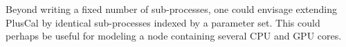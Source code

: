\documentclass{article}
\begin{document}
Beyond writing a fixed number of sub-processes, one could envisage extending PlusCal by identical sub-processes indexed by a parameter set. This could perhaps be useful for modeling a node containing several CPU and GPU cores.





     

\end{document}
